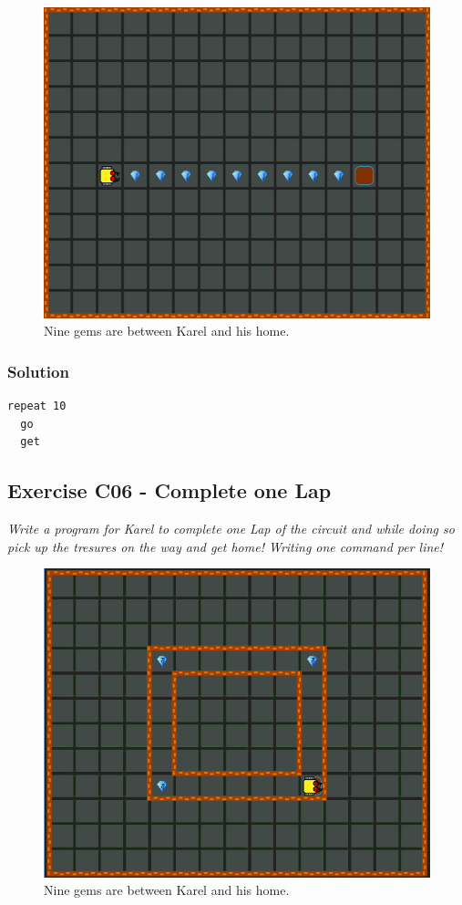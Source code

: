 \documentclass[article,A4,12pt]{llncs}
\begin{document}
{{{{\begin{figure}[!ht]
\begin{center}
\includegraphics[height=0.4\textwidth]{imgk/c05.png}
\end{center}
\vspace{-4mm}
\caption{Nine gems are between Karel and his home.}
\label{fig:c05}
\end{figure}
\noindent

\subsubsection{Solution}
\begin{verbatim}
repeat 10
  go
  get
\end{verbatim}

\subsection{Exercise C06 - Complete one Lap}

{\em Write a program for Karel to complete one Lap of the circuit and while doing so pick up the tresures on the way and get home! 
Writing one command per line!}

\vspace{-5mm}
\begin{figure}[!ht]
\begin{center}
\includegraphics[height=0.4\textwidth]{imgk/a28.png}
\end{center}
\vspace{-4mm}
\caption{Nine gems are between Karel and his home.}
\label{fig:a28}
\end{figure}
\noindent

}}}}
\end{document}
